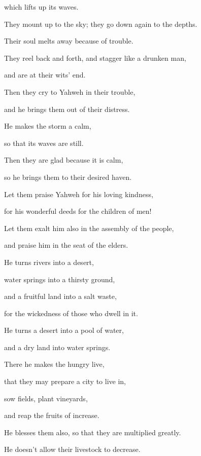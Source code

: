 {\par }{\QB which lifts up its waves.
\par }{\Q {}They mount up to the sky; they go down again to the depths.
\par }{\QB Their soul melts away because of trouble.
\par }{\Q {}They reel back and forth, and stagger like a drunken man,
\par }{\QB and are at their wits’ end.
\par }{\Q {}Then they cry to Yahweh in their trouble,
\par }{\QB and he brings them out of their distress.
\par }{\Q {}He makes the storm a calm,
\par }{\QB so that its waves are still.
\par }{\Q {}Then they are glad because it is calm,
\par }{\QB so he brings them to their desired haven.
\par }{\Q {}Let them praise Yahweh for his loving kindness,
\par }{\QB for his wonderful deeds for the children of men!
\par }{\BB \par }{\Q {}Let them exalt him also in the assembly of the people,
\par }{\QB and praise him in the seat of the elders.
\par }{\BB \par }{\Q {}He turns rivers into a desert,
\par }{\QB water springs into a thirsty ground,
\par }{\QB {}and a fruitful land into a salt waste,
\par }{\QB for the wickedness of those who dwell in it.
\par }{\Q {}He turns a desert into a pool of water,
\par }{\QB and a dry land into water springs.
\par }{\Q {}There he makes the hungry live,
\par }{\QB that they may prepare a city to live in,
\par }{\QB {}sow fields, plant vineyards,
\par }{\QB and reap the fruits of increase.
\par }{\Q {}He blesses them also, so that they are multiplied greatly.
\par }{\QB He doesn’t allow their livestock to decrease.
}
